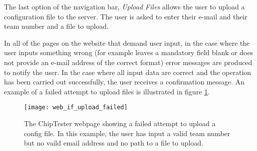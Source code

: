 The last option of the navigation bar, \textit{Upload Files} allows the user to upload a configuration file to the server. The user is asked to enter their e-mail and their team number and a file to upload.

In all of the pages on the website that demand user input, in the case where the user inputs something wrong (for example leaves a mandatory field blank or does not provide an e-mail address of the correct format) error messages are produced to notify the user. In the case where all input data are correct and the operation has been carried out successfully, the user receives a confirmation message. An example of a failed attempt to upload files is illustrated in figure \ref{fig:web_if_upload_failed}.

\begin{figure}[ht]
 \centering
 \texttt{[image: web\_if\_upload\_failed]}
 \caption{The ChipTester webpage showing a failed attempt to upload a config file. In this example, the user has input a valid team number but no vaild email address and no path to a file to upload.}
 \label{fig:web_if_upload_failed}
\end{figure}


